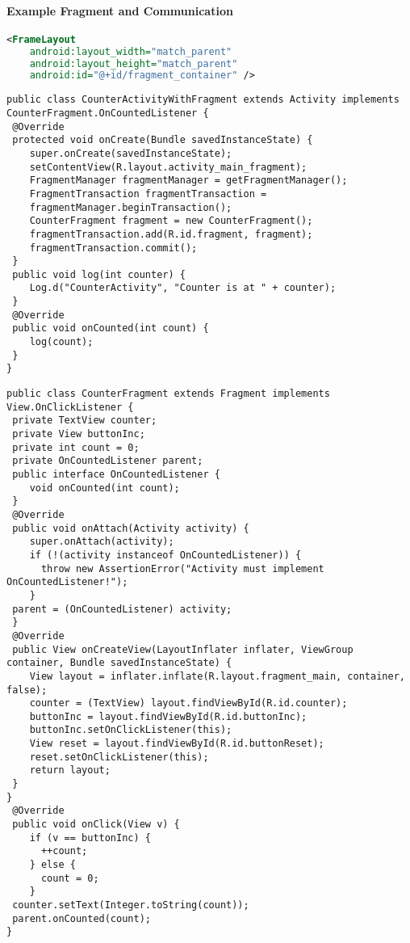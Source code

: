 \paragraph{Example Fragment and Communication}
\begin{lstlisting}[language=xml]
<FrameLayout
    android:layout_width="match_parent"
    android:layout_height="match_parent"
    android:id="@+id/fragment_container" />
\end{lstlisting}
\begin{lstlisting}
public class CounterActivityWithFragment extends Activity implements CounterFragment.OnCountedListener {
 @Override
 protected void onCreate(Bundle savedInstanceState) {
    super.onCreate(savedInstanceState);
    setContentView(R.layout.activity_main_fragment);
    FragmentManager fragmentManager = getFragmentManager();
    FragmentTransaction fragmentTransaction =
    fragmentManager.beginTransaction();
    CounterFragment fragment = new CounterFragment();
    fragmentTransaction.add(R.id.fragment, fragment);
    fragmentTransaction.commit();
 }
 public void log(int counter) {
    Log.d("CounterActivity", "Counter is at " + counter);
 }
 @Override
 public void onCounted(int count) {
    log(count);
 }
}
\end{lstlisting}
\begin{lstlisting}
public class CounterFragment extends Fragment implements View.OnClickListener {
 private TextView counter;
 private View buttonInc;
 private int count = 0;
 private OnCountedListener parent;
 public interface OnCountedListener {
    void onCounted(int count);
 }
 @Override
 public void onAttach(Activity activity) {
    super.onAttach(activity);
    if (!(activity instanceof OnCountedListener)) {
      throw new AssertionError("Activity must implement OnCountedListener!");
    }
 parent = (OnCountedListener) activity;
 }
 @Override
 public View onCreateView(LayoutInflater inflater, ViewGroup container, Bundle savedInstanceState) {
    View layout = inflater.inflate(R.layout.fragment_main, container, false);
    counter = (TextView) layout.findViewById(R.id.counter);
    buttonInc = layout.findViewById(R.id.buttonInc);
    buttonInc.setOnClickListener(this);
    View reset = layout.findViewById(R.id.buttonReset);
    reset.setOnClickListener(this);
    return layout;
 }
}
 @Override
 public void onClick(View v) {
    if (v == buttonInc) {
      ++count;
    } else {
      count = 0;
    }
 counter.setText(Integer.toString(count));
 parent.onCounted(count);
}
\end{lstlisting}
